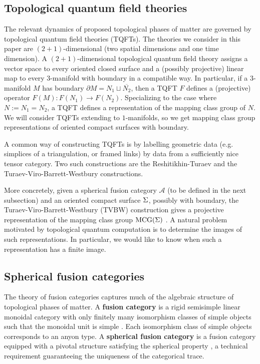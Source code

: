 \subsection{Topological quantum field theories}
The relevant dynamics of proposed topological phases of matter are governed by topological quantum field theories (TQFTs). The theories we consider in this paper are $(2+1)$-dimensional (two spatial dimensions and one time dimension). A $(2+1)$-dimensional topological quantum field theory assigns a vector space to every oriented closed surface and a (possibly projective) linear map to every $3$-manifold with boundary in a compatible way.  In particular, if a $3$-manifold $M$ has boundary $\partial M = N_1 \sqcup \overline{N_2}$, then a TQFT $F$  defines a (projective) operator $F(M) : F(N_1) \to F(N_2)$.   Specializing to the case where $N := N_1 = N_2$, a TQFT defines a representation of the mapping class group of $N$.  We will consider TQFTs extending to $1$-manifolds, so we get mapping class group representations of oriented compact surfaces with boundary.

A common way of constructing TQFTs is by labelling geometric data (e.g. simplices of a triangulation, or framed links) by data from a sufficiently nice tensor category.  Two such constructions are the Reshitikhin-Turaev \cite{reshetikhin1991invariants} and the Turaev-Viro-Barrett-Westbury \cite{hep-th/9311155, TURAEV1992865} constructions.

More concretely, given a spherical fusion category $\mathcal A$ (to be defined in the next subsection) and an oriented compact surface $\Sigma$, possibly with boundary, the Turaev-Viro-Barrett-Westbury (TVBW) construction gives a projective representation of the mapping class group $\operatorname{MCG}(\Sigma)$ \cite{hep-th/9311155, TURAEV1992865}. A natural problem motivated by topological quantum computation is to determine the images of such representations.  In particular, we would like to know when such a representation has a finite image.

\subsection{Spherical fusion categories}
The theory of fusion categories captures much of the algebraic structure of topological phases of matter. A \textbf{fusion category} is a rigid semisimple linear monoidal category with only finitely many isomorphism classes of simple objects such that the monoidal unit is simple \cite{etingofTensor}.  Each isomorphism class of simple objects corresponds to an anyon type.  A \textbf{spherical fusion category} is a fusion category equipped with a pivotal structure satisfying the spherical property \cite{etingofTensor}, a technical requirement guaranteeing the uniqueness of the categorical trace.  

